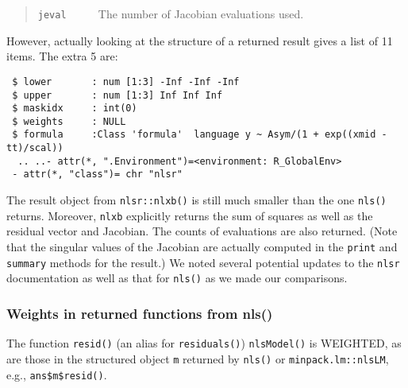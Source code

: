 \documentclass[
]{article}
\begin{document}
\begin{quote}
\texttt{jeval} \(~~~~~~~~~~\) The number of Jacobian evaluations used.
\end{quote}

However, actually looking at the structure of a returned result gives a
list of 11 items. The extra 5 are:

\begin{verbatim}
 $ lower       : num [1:3] -Inf -Inf -Inf
 $ upper       : num [1:3] Inf Inf Inf
 $ maskidx     : int(0) 
 $ weights     : NULL
 $ formula     :Class 'formula'  language y ~ Asym/(1 + exp((xmid - tt)/scal))
  .. ..- attr(*, ".Environment")=<environment: R_GlobalEnv> 
 - attr(*, "class")= chr "nlsr"
\end{verbatim}

The result object from \texttt{nlsr::nlxb()} is still much smaller than
the one \texttt{nls()} returns. Moreover, \texttt{nlxb} explicitly
returns the sum of squares as well as the residual vector and Jacobian.
The counts of evaluations are also returned. (Note that the singular
values of the Jacobian are actually computed in the \texttt{print} and
\texttt{summary} methods for the result.) We noted several potential
updates to the \texttt{nlsr} documentation as well as that for
\texttt{nls()} as we made our comparisons.

\hypertarget{weights-in-returned-functions-from-nls}{%
\subsubsection{Weights in returned functions from
nls()}\label{weights-in-returned-functions-from-nls}}

The function \texttt{resid()} (an alias for \texttt{residuals()})
\texttt{nlsModel()} is WEIGHTED, as are those in the structured object
\texttt{m} returned by \texttt{nls()} or \texttt{minpack.lm::nlsLM},
e.g., \texttt{ans\$m\$resid()}.
\end{document}
